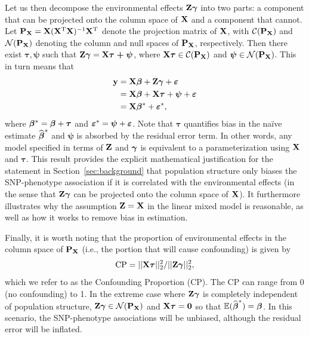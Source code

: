 Let us then decompose the environmental effects $\mathbf{Z} \boldsymbol{\gamma}$ into two parts: a component that can be projected onto the column space of $\mathbf{X}$ and a component that cannot. Let $\mathbf{P}_{\mathbf{X}} = \mathbf{X} (\mathbf{X}^{\text{T}} \mathbf{X})^{-1} \mathbf{X}^{\text{T}}$ denote the projection matrix of $\mathbf{X}$, with $\mathcal{C}(\mathbf{P}_{\mathbf{X}})$ and $\mathcal{N}(\mathbf{P}_{\mathbf{X}})$ denoting the column and null spaces of $\mathbf{P}_{\mathbf{X}}$, respectively. Then there exist $\boldsymbol{\tau}, \boldsymbol{\psi}$ such that $\mathbf{Z} \boldsymbol{\gamma} = \mathbf{X} \boldsymbol{\tau + \psi}$, where $\mathbf{X} \boldsymbol{\tau} \in \mathcal{C}(\mathbf{P}_{\mathbf{X}})$ and $\boldsymbol{\psi} \in \mathcal{N}(\mathbf{P}_{\mathbf{X}})$.  This in turn means that
\begin{equation}
  \begin{aligned}
    \label{eqn:partition_e}
    \mathbf{y} &= \mathbf{X}\boldsymbol{\beta}{} + \mathbf{Z}\boldsymbol{\gamma} + \boldsymbol{\varepsilon}{} \\
    &= \mathbf{X}\boldsymbol{\beta}{} + \mathbf{X} \boldsymbol{\tau} + \boldsymbol{\psi} + \boldsymbol{\varepsilon}{} \\
    &=  \mathbf{X} \boldsymbol{\beta}{}{^*} + \boldsymbol{\varepsilon}{}{^*},
  \end{aligned}
\end{equation}
where $\boldsymbol{\beta}{}^* = \boldsymbol{\beta}{} + \boldsymbol{\tau}$ and $\boldsymbol{\varepsilon}{}{^*} = \boldsymbol{\psi} + \boldsymbol{\varepsilon}{}$.  Note that $\boldsymbol{\tau}$ quantifies bias in the na\"ive estimate $\widehat{\boldsymbol{\beta}{}}^*$ and $\boldsymbol{\psi}$ is absorbed by the residual error term. In other words, any model specified in terms of $\mathbf{Z}$ and $\boldsymbol{\gamma}$ is equivalent to a parameterization using $\mathbf{X}$ and $\boldsymbol{\tau}$.  This result provides the explicit mathematical justification for the statement in Section~\ref{sec:background} that population structure only biases the SNP-phenotype association if it is correlated with the environmental effects (in the sense that $\mathbf{Z}\boldsymbol{\gamma}$ can be projected onto the column space of $\mathbf{X}$). It furthermore illustrates why the assumption $\mathbf{Z}=\mathbf{X}$ in the linear mixed model is reasonable, as well as how it works to remove bias in estimation.

Finally, it is worth noting that the proportion of environmental effects in the column space of $\mathbf{P}_{\mathbf{X}}$ (i.e., the portion that will cause confounding) is given by
\begin{equation}
    \label{eqn:ratio}
    \text{CP} = ||\mathbf{X} \boldsymbol{\tau}||_2^2 / ||\mathbf{Z} \boldsymbol{\gamma}||_2^2,
\end{equation}
which we refer to as the Confounding Proportion (CP). The CP can range from 0 (no confounding) to 1. In the extreme case where $\mathbf{Z} \boldsymbol{\gamma}$ is completely independent of population structure, $\mathbf{Z} \boldsymbol{\gamma} \in \mathcal{N}(\mathbf{P}_{\mathbf{X}})$ and $\mathbf{X} \boldsymbol{\tau} = \boldsymbol{0}$ so that $\mathbb{E}(\widehat{\boldsymbol{\beta}{}}^*) = \boldsymbol{\beta}{}$. In this scenario, the SNP-phenotype associations will be unbiased, although the residual error will be inflated. 

